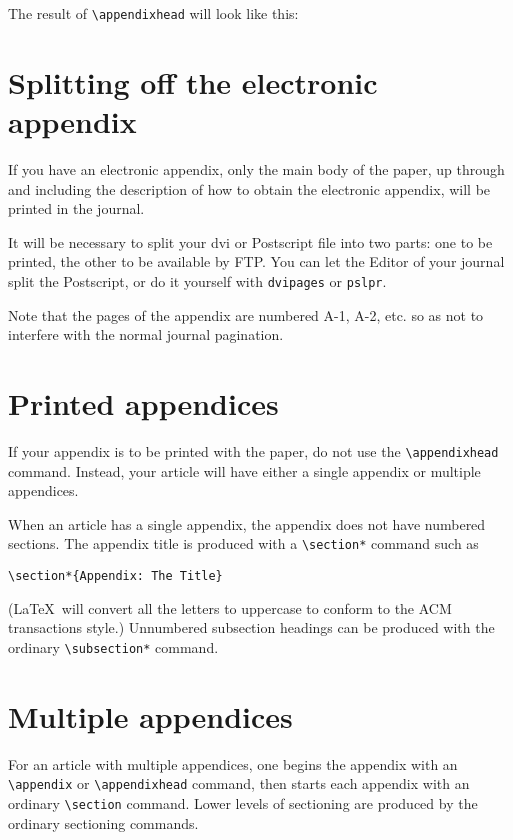 The result of \verb|\appendixhead| will look like this:

\section{Splitting off the electronic appendix}

If you have an electronic appendix, only the main body of the
paper, up through and including the description of how to obtain
the electronic appendix, will be printed in the journal.

It will be necessary to split your dvi or Postscript file into
two parts: one to be printed, the other to be available by
FTP.  You can let the Editor of your journal split the Postscript, or
do it yourself with {\tt dvipages} or {\tt pslpr}.

Note that the pages of the appendix are numbered A-1, A-2, etc.
so as not to interfere with the normal journal pagination.

\section{Printed appendices}

If your appendix is to be printed with the paper, do not use
the \verb|\appendixhead| command.  Instead, your article will
have either a single appendix or multiple appendices.

When an article
has a single appendix, the appendix does not have numbered
sections.  The appendix title is produced with a
\verb|\section*| command such as
\begin{verbatim}
\section*{Appendix: The Title}
\end{verbatim}
(\LaTeX\ will convert all the letters to uppercase to conform
to the ACM transactions style.)  Unnumbered subsection
headings can be produced with the ordinary \verb|\subsection*|
command.

\section{Multiple appendices}

For an article with multiple appendices, one begins
the appendix with an \verb|\appendix| or \verb|\appendixhead|
command, then starts each
appendix with an ordinary \verb|\section| command.  Lower levels of
sectioning are produced by the ordinary sectioning commands.



